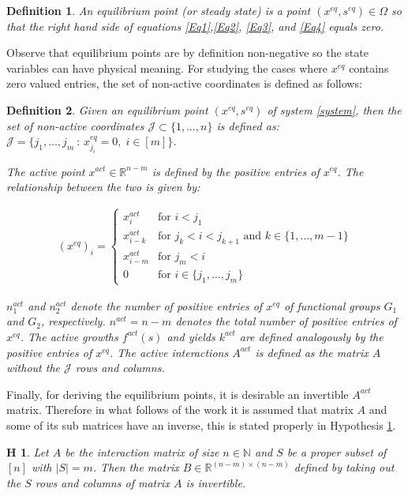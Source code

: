 \documentclass[3p,times]{article}
\newcommand{\N}{\mathbb{N}}
\newcommand{\R}{\mathbb{R}}
\newtheorem{defn}{Definition}
\newtheorem{hypo}{H}
\begin{document}
\begin{defn} 
	An equilibrium point (or steady state) is a point $(x^{eq},s^{eq}) \in \Omega$ so that the right hand side of equations \eqref{Eq1},\eqref{Eq2}, \eqref{Eq3}, and \eqref{Eq4} equals zero. 
\end{defn} 

Observe that equilibrium points are by definition non-negative so the state variables can have physical meaning. For studying the cases where $x^{eq}$ contains zero valued entries, the set of non-active coordinates is defined as follows:

\begin{defn}
	Given an equilibrium point $(x^{eq},s^{eq})$ of system \eqref{system}, then the set of non-active coordinates $\mathcal{J}\subset \{1,\dots,n\}$ is defined as:
	$\mathcal{J} = \{j_1, \dots, j_m\ : \, x^{eq}_{j_i} = 0 , \;i \in [m] \} $.
	
	The active point $x^{act}\in \R^{n-m}$ is defined by the positive entries of $x^{eq}$. The relationship between the two is given by:
	
	\begin{align}\label{EquilibriaFormula} (x^{eq})_i = \begin{cases}
	x^{act}_i & \text{for } i < j_1\\
	x^{act}_{i-k} & \text{for } j_{k}< i <j_{k+1}  \text{ and } k \in \{1,\dots,m-1\}\\
	x^{act}_{i-m} & \text{for } j_{m}< i \\
	0 & \text{for } i \in \{j_1, \dots, j_m\}
	\end{cases} \end{align}	
	
	$n_1^{act}$ and $n_2^{act}$ denote the number of positive entries of $x^{eq}$ of functional groups $G_1$ and $G_2$, respectively. $n^{act} = n-m$ denotes the total number of positive entries of $x^{eq}$. The active growths $f^{act}(s)$ and yields $k^{act}$ are defined analogously by the positive entries of $x^{eq}$. The active interactions $A^{act}$ is defined as the matrix $A$ without the $\mathcal{J}$ rows and columns. 
\end{defn}
 
 Finally, for deriving the equilibrium points, it is desirable an invertible $A^{act}$ matrix. Therefore in what follows of the work it is assumed that matrix $A$ and some of its sub matrices have an inverse, this is stated properly in Hypothesis \ref{inverse hypothesis}. 

\begin{hypo}
	Let $A$ be the interaction matrix of size $n \in \N$ and $S$ be a proper subset of $[n]$ with $|S| = m$. Then the matrix $B \in \R^{(n-m) \times (n-m)}$ defined by taking out the $S$ rows and columns of matrix $A$ is invertible.
	\label{inverse hypothesis}
\end{hypo} 
\end{document}

